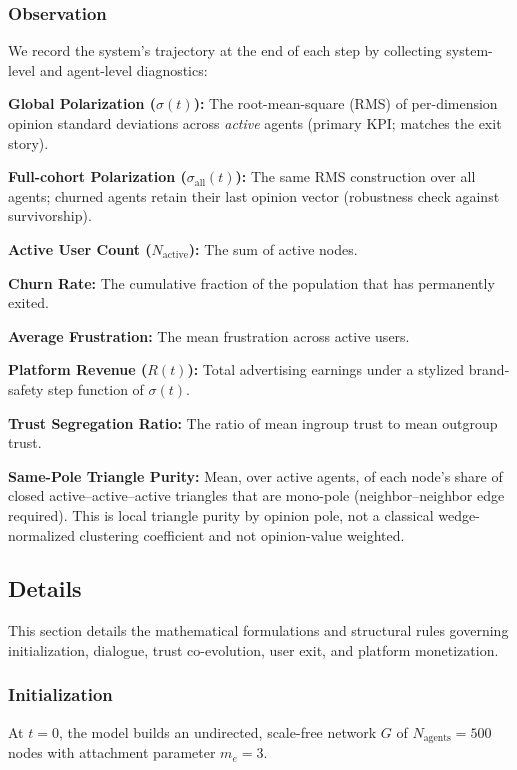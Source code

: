 \subsubsection{Observation}
We record the system's trajectory at the end of each step by collecting system-level and agent-level diagnostics:
\begin{itemize*}
    \item \textbf{Global Polarization ($\sigma(t)$):} The root-mean-square (RMS) of per-dimension opinion standard deviations across \emph{active} agents (primary KPI; matches the exit story).
    \item \textbf{Full-cohort Polarization ($\sigma_{\mathrm{all}}(t)$):} The same RMS construction over all agents; churned agents retain their last opinion vector (robustness check against survivorship).
    \item \textbf{Active User Count ($N_{\text{active}}$):} The sum of active nodes.
    \item \textbf{Churn Rate:} The cumulative fraction of the population that has permanently exited.
    \item \textbf{Average Frustration:} The mean frustration across active users.
    \item \textbf{Platform Revenue ($R(t)$):} Total advertising earnings under a stylized brand-safety step function of $\sigma(t)$.
    \item \textbf{Trust Segregation Ratio:} The ratio of mean ingroup trust to mean outgroup trust.
    \item \textbf{Same-Pole Triangle Purity:} Mean, over active agents, of each node's share of closed active--active--active triangles that are mono-pole (neighbor--neighbor edge required). This is local triangle purity by opinion pole, not a classical wedge-normalized clustering coefficient and not opinion-value weighted.
\end{itemize*}

\subsection{Details}

This section details the mathematical formulations and structural rules governing initialization, dialogue, trust co-evolution, user exit, and platform monetization.

\subsubsection{Initialization}
At $t = 0$, the model builds an undirected, scale-free network $G$ of $N_{\text{agents}} = 500$ nodes with attachment parameter $m_e = 3$.

